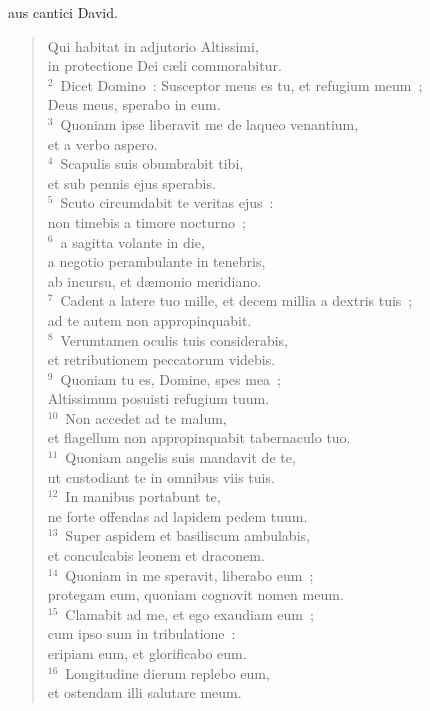 \bchapter[Psalm]
aus cantici David. \begin{verse}Qui habitat in adjutorio Altissimi,\\ in protectione Dei c\ae li commorabitur.\\
${}^{2}$~Dicet Domino~: Susceptor meus es tu, et refugium meum~;\\ Deus meus, sperabo in eum.\\
${}^{3}$~Quoniam ipse liberavit me de laqueo venantium,\\ et a verbo aspero.\\
${}^{4}$~Scapulis suis obumbrabit tibi,\\ et sub pennis ejus sperabis.\\
${}^{5}$~Scuto circumdabit te veritas ejus~:\\ non timebis a timore nocturno~;\\
${}^{6}$~a sagitta volante in die,\\ a negotio perambulante in tenebris,\\ ab incursu, et d\ae monio meridiano.\\
${}^{7}$~Cadent a latere tuo mille, et decem millia a dextris tuis~;\\ ad te autem non appropinquabit.\\
${}^{8}$~Verumtamen oculis tuis considerabis,\\ et retributionem peccatorum videbis.\\
${}^{9}$~Quoniam tu es, Domine, spes mea~;\\ Altissimum posuisti refugium tuum.\\
${}^{10}$~Non accedet ad te malum,\\ et flagellum non appropinquabit tabernaculo tuo.\\
${}^{11}$~Quoniam angelis suis mandavit de te,\\ ut custodiant te in omnibus viis tuis.\\
${}^{12}$~In manibus portabunt te,\\ ne forte offendas ad lapidem pedem tuum.\\
${}^{13}$~Super aspidem et basiliscum ambulabis,\\ et conculcabis leonem et draconem.\\
${}^{14}$~Quoniam in me speravit, liberabo eum~;\\ protegam eum, quoniam cognovit nomen meum.\\
${}^{15}$~Clamabit ad me, et ego exaudiam eum~;\\ cum ipso sum in tribulatione~:\\ eripiam eum, et glorificabo eum.\\
${}^{16}$~Longitudine dierum replebo eum,\\ et ostendam illi salutare meum.\end{verse}



